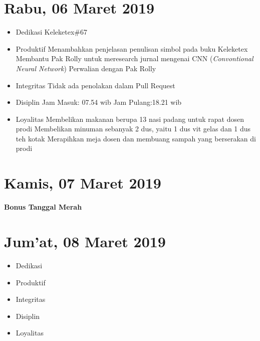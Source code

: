 \section{Rabu, 06 Maret 2019}
\begin{itemize}
\item Dedikasi
\subitem Keleketex\#67
\item Produktif
  \subitem Menambahkan penjelasan penulisan simbol pada buku Keleketex
  \subitem Membantu Pak Rolly untuk meresearch jurnal mengenai CNN (\textit{Convontional Neural Network})
  \subitem Perwalian dengan Pak Rolly
\item Integritas
  \subitem Tidak ada penolakan dalam Pull Request
\item Disiplin
  \subitem Jam Masuk: 07.54 wib
  \subitem Jam Pulang:18.21 wib
\item Loyalitas
  \subitem Membelikan makanan berupa 13 nasi padang untuk rapat dosen prodi 
  \subitem Membelikan minuman sebanyak 2 dus, yaitu 1 dus vit gelas dan 1 dus teh kotak
  \subitem Merapihkan meja dosen dan membuang sampah yang berserakan di prodi
\end{itemize}

\section{Kamis, 07 Maret 2019}
\textbf{Bonus Tanggal Merah}

\section{Jum'at, 08 Maret 2019}
\begin{itemize}
\item Dedikasi

\item Produktif

\item Integritas

\item Disiplin

\item Loyalitas

\end{itemize}





